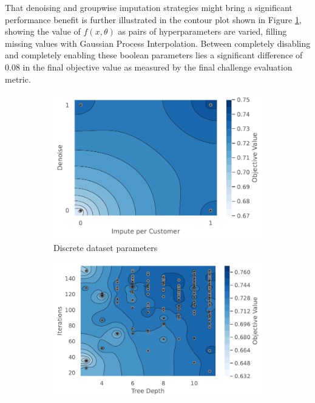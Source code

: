 \documentclass[runningheads]{llncs}
\begin{document}
That denoising and groupwise imputation strategies might bring a significant performance benefit is further illustrated in the contour plot shown in Figure \ref{fig:hyperparam-dataset-contour-plots--discrete-dataset}, showing the value of $f(x, \theta)$ as pairs of hyperparameters are varied, filling missing values with Gaussian Process Interpolation. Between completely disabling and completely enabling these boolean parameters lies a significant difference of $0.08$ in the final objective value as measured by the final challenge evaluation metric.

\begin{figure}
     \centering
     \begin{subfigure}[b]{0.49\textwidth}
         \centering
         \includegraphics[width=\textwidth]{220915_contour_impute_per_customer_denoise.pdf}
         \caption{Discrete dataset parameters}
         \label{fig:hyperparam-dataset-contour-plots--discrete-dataset}
     \end{subfigure}
     \hfill
     \begin{subfigure}[b]{0.49\textwidth}
         \centering
         \includegraphics[width=\textwidth]{220915_contour_iterations_vs_tree_depth.pdf}

\end{subfigure}
\end{figure}
\end{document}
